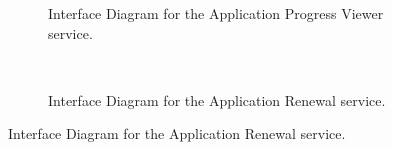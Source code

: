 \documentclass[12pt]{article}
\begin{document}
\begin{figure}[H]

\begin{subfigure}[p]{0.47\textwidth}
\centering	
{}
\caption{Interface Diagram for the Application Progress Viewer service.}
\end{subfigure}
~
\begin{subfigure}[p]{0.47\textwidth}
\centering	
{}
\caption{Interface Diagram for the Application Renewal service.}
\end{subfigure}


\end{figure}
\end{document}
